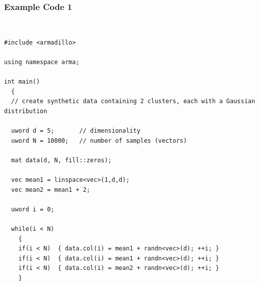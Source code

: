 \documentclass[usenames,dvipsnames]{beamer}
\begin{document}
%
%
%

\begin{frame}[fragile=singleslide]
\frametitle{Example Code 1}

\begin{minipage}{1.00\textwidth}
\begin{minipage}{0.05\textwidth}
~
\end{minipage}
\begin{minipage}{0.90\textwidth}
\begin{Verbatim}[fontsize=\tiny]
#include <armadillo>

using namespace arma;

int main()
  {
  // create synthetic data containing 2 clusters, each with a Gaussian distribution
  
  uword d = 5;       // dimensionality
  uword N = 10000;   // number of samples (vectors)
  
  mat data(d, N, fill::zeros);
  
  vec mean1 = linspace<vec>(1,d,d);
  vec mean2 = mean1 + 2;
  
  uword i = 0;
  
  while(i < N)
    {
    if(i < N)  { data.col(i) = mean1 + randn<vec>(d); ++i; }
    if(i < N)  { data.col(i) = mean1 + randn<vec>(d); ++i; }
    if(i < N)  { data.col(i) = mean2 + randn<vec>(d); ++i; }
    }
\end{Verbatim}
\end{minipage}
\end{minipage}
\end{frame}

%
%
%
\end{document}
